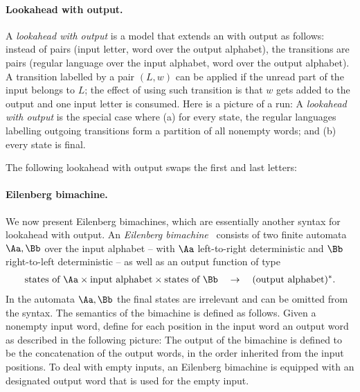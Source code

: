 \paragraph*{Lookahead \dfa with output.}
A \emph{lookahead \nfa with output} is a model that extends an \nfa with output as follows: instead of pairs (input letter, word over the output alphabet), the transitions are pairs (regular language over the input alphabet,  word over the output alphabet). A transition  labelled by a pair $(L,w)$ can be applied if the unread part of the input belongs to $L$; the effect of using such transition is that $w$ gets added to the output and one input letter is consumed. Here is a picture of a run:
 A \emph{lookahead \dfa with output} is the special case where (a)  for every state, the regular languages labelling outgoing transitions form a partition of all nonempty words; and (b) every state is final.


\begin{example}
The following lookahead \dfa with output swaps the first and last letters: 
\end{example}


\paragraph*{Eilenberg bimachine.} We now present Eilenberg bimachines, which are essentially another syntax for lookahead \dfa with output. An \emph{Eilenberg bimachine}~\cite[Chapter XI.7]{Eilenberg:1974vl} consists of two finite automata $\Aa, \Bb$ over the input alphabet -- with $\Aa$ left-to-right deterministic and $\Bb$  right-to-left  deterministic --  as well as an output function of type
\begin{align*}
\text{states of $\Aa$} \times \text{input alphabet} \times \text{states of $\Bb$} \quad \to \quad (\text{output alphabet})^*.
\end{align*}
In the automata $\Aa,\Bb$ the final states are irrelevant and can be omitted from the syntax.
The semantics of the bimachine is defined as follows. Given a nonempty input word,  define for each position in the input word an output word as described in the following picture: 
The output of the bimachine is defined to be the concatenation of the output words, in the order inherited from the input positions.  To deal with empty inputs, an Eilenberg bimachine is equipped with an designated output word that is used for the empty input.


